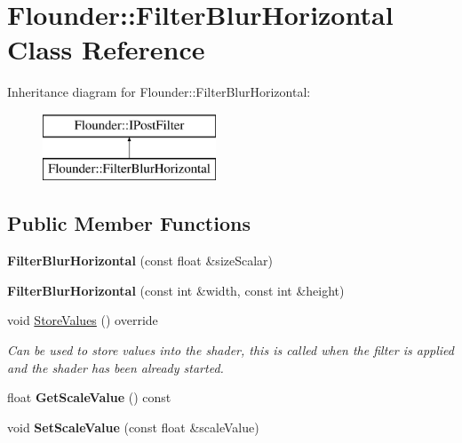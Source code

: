 \hypertarget{class_flounder_1_1_filter_blur_horizontal}{}\section{Flounder\+:\+:Filter\+Blur\+Horizontal Class Reference}
\label{class_flounder_1_1_filter_blur_horizontal}
Inheritance diagram for Flounder\+:\+:Filter\+Blur\+Horizontal\+:\begin{figure}[H]
\begin{center}
\leavevmode
\includegraphics[height=2.000000cm]{class_flounder_1_1_filter_blur_horizontal}
\end{center}
\end{figure}
\subsection*{Public Member Functions}
\begin{DoxyCompactItemize}
\item 
\mbox{\label{class_flounder_1_1_filter_blur_horizontal_a7d824684abbbf26897776bdd3ab75646}} 
{\bfseries Filter\+Blur\+Horizontal} (const float \&size\+Scalar)
\item 
\mbox{\label{class_flounder_1_1_filter_blur_horizontal_a9d3866d7ee9a61f2148e8affd20b2757}} 
{\bfseries Filter\+Blur\+Horizontal} (const int \&width, const int \&height)
\item 
void \hyperlink{class_flounder_1_1_filter_blur_horizontal_ad08698d066532bee9660cd80c42cac60}{Store\+Values} () override
\begin{DoxyCompactList}\small\item\em Can be used to store values into the shader, this is called when the filter is applied and the shader has been already started. \end{DoxyCompactList}\item 
\mbox{\label{class_flounder_1_1_filter_blur_horizontal_a32ebc78cf47b540ff13fd70081e9a619}} 
float {\bfseries Get\+Scale\+Value} () const
\item 
\mbox{\label{class_flounder_1_1_filter_blur_horizontal_a7ab8bef420674ab67095bd93fa0cd2e2}} 
void {\bfseries Set\+Scale\+Value} (const float \&scale\+Value)
\end{DoxyCompactItemize}
